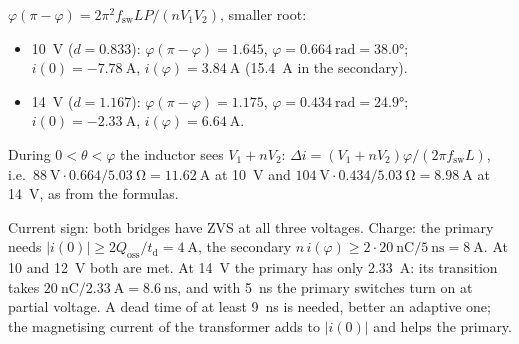 \begin{solutionblock}
	$\varphi(\pi-\varphi)=2\pi^2f_\mathrm{sw}LP/(nV_1V_2)$, smaller root:
	\begin{itemize}
		\item \SI{10}{\volt} ($d=0.833$): $\varphi(\pi-\varphi)=1.645$, $\varphi=\SI{0.664}{\radian}=\ang{38.0}$; $i(0)=\SI{-7.78}{\ampere}$, $i(\varphi)=\SI{3.84}{\ampere}$ (\SI{15.4}{\ampere} in the secondary).
		\item \SI{14}{\volt} ($d=1.167$): $\varphi(\pi-\varphi)=1.175$, $\varphi=\SI{0.434}{\radian}=\ang{24.9}$; $i(0)=\SI{-2.33}{\ampere}$, $i(\varphi)=\SI{6.64}{\ampere}$.
	\end{itemize}
	During $0<\theta<\varphi$ the inductor sees $V_1+nV_2$: $\Delta i=(V_1+nV_2)\varphi/(2\pi f_\mathrm{sw}L)$, i.e.\ $\SI{88}{\volt}\cdot0.664/\SI{5.03}{\ohm}=\SI{11.62}{\ampere}$ at \SI{10}{\volt} and $\SI{104}{\volt}\cdot0.434/\SI{5.03}{\ohm}=\SI{8.98}{\ampere}$ at \SI{14}{\volt}, as from the formulas.
\end{solutionblock}


\begin{solutionblock}
	Current sign: both bridges have ZVS at all three voltages. Charge: the primary needs $|i(0)|\geq2Q_\mathrm{oss}/t_\mathrm{d}=\SI{4}{\ampere}$, the secondary $n\,i(\varphi)\geq2\cdot\SI{20}{\nano\coulomb}/\SI{5}{\nano\second}=\SI{8}{\ampere}$.
	At 10 and \SI{12}{\volt} both are met. At \SI{14}{\volt} the primary has only \SI{2.33}{\ampere}: its transition takes $\SI{20}{\nano\coulomb}/\SI{2.33}{\ampere}=\SI{8.6}{\nano\second}$, and with \SI{5}{\nano\second} the primary switches turn on at partial voltage. A dead time of at least \SI{9}{\nano\second} is needed, better an adaptive one; the magnetising current of the transformer adds to $|i(0)|$ and helps the primary.
\end{solutionblock}


